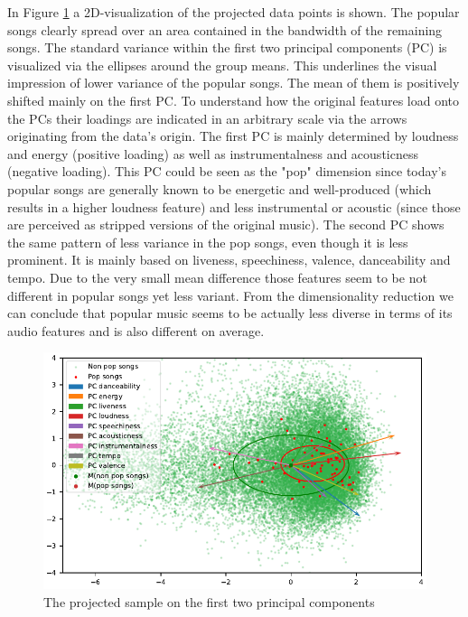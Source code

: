 \documentclass{article}
\begin{document}
In Figure \ref{fig:pca} a 2D-visualization of the projected data points is shown. The popular songs clearly spread over an area contained in the bandwidth of the remaining songs. The standard variance within the first two principal components (PC) is visualized via the ellipses around the group means. This underlines the visual impression of lower variance of the popular songs. The mean of them is positively shifted mainly on the first PC. To understand how the original features load onto the PCs their loadings are indicated in an arbitrary scale via the arrows originating from the data's origin. The first PC is mainly determined by loudness and energy (positive loading) as well as instrumentalness and acousticness (negative loading). This PC could be seen as the "pop" dimension since today's popular songs are generally known to be energetic and well-produced (which results in a higher loudness feature) and less instrumental or acoustic (since those are perceived as stripped versions of the original music). The second PC shows the same pattern of less variance in the pop songs, even though it is less prominent. It is mainly based on liveness, speechiness, valence, danceability and tempo. Due to the very small mean difference those features seem to be not different in popular songs yet less variant. From the dimensionality reduction we can conclude that popular music seems to be actually less diverse in terms of its audio features and is also different on average.
\begin{figure}
  \centering
  \includegraphics[]{../fig/001_pca.pdf}
  \caption{The projected sample on the first two principal components}
  \label{fig:pca}
\end{figure}
\end{document}
